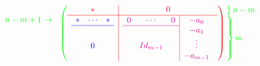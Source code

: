 \documentclass{article}
\begin{document}
	\[
		\color{green}
		\begin{array}{c}
				\vphantom{*}
				n-m+1 \rightarrow
				\vphantom{-a_1}  \\
				\vphantom{\vdots}  \\
				\vphantom{-a_{m-1}}  
		\end{array}
		\left(
			\color{red}
			\begin{array}{c|c}
				* & 0 \\ \hline
				\color{blue}
				\begin{array}{c c c}
					* & \cdots & * \\ \hline
						&        & \vphantom{-a_1}  \\
						&    0   & \vphantom{\vdots}  \\
						&        & \vphantom{-a_{m-1}}  
				\end{array}
				& 
				\color{magenta}
				\begin{array}{c c c|c}
					0 & \cdots & 0 & -a_0 \\ \cline{1-3}
						&        &   & -a_1 \\
						&Id_{m-1}&   & \vdots \\
						&        &   & -a_{m-1}
				\end{array} 
			\end{array}
		\right)
		\begin{array}{@{\kern-\nulldelimiterspace}l@{}}
		\left.
			\begin{array}{@{}c@{}}
				\vphantom{0}
			\end{array}
		\right\}n-m \\
		\left.
			\begin{array}{@{}c@{}}
				\vphantom{-a_0} \\ 
				\vphantom{-a_1} \\
				\vphantom{\vdots} \\
				\vphantom{-a_{m-1}}
			\end{array}
		\right\}m
		\end{array}
	\]
\end{document}
